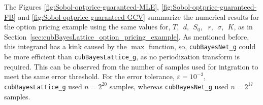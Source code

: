 \documentclass{svjour3}                     %
\newcommand{\code}[1]{\texttt{#1}}
\newcommand\secref{Section~\ref}
\begin{document}
{{{{{{%
The Figures \ref{fig:Sobol-optprice-guaranteed-MLE}, \ref{fig:Sobol-optprice-guaranteed-FB} and 
\ref{fig:Sobol-optprice-guaranteed-GCV} summarize the numerical results for the option pricing example using the same values for,
$
T, \ \ d, \ \ S_0$, $\ \ r, \ \ \sigma, \ \ K
$, as in \secref{sec:cubBayesLattice_option_pricing_example}.
As mentioned before, this integrand has a kink caused by the $\max$ function, so, \code{cubBayesNet\_g} could be more efficient than \code{cubBayesLattice\_g}, as no periodization transform is required. This can be observed from the number of samples used for intgration to meet the same error threshold. For the error tolerance, $\varepsilon=10^{-3}$,  \code{cubBayesLattice\_g} used $n=2^{20}$ samples, whereas \code{cubBayesNet\_g} used $n=2^{17}$ samples.


}}}}}}
\end{document}
